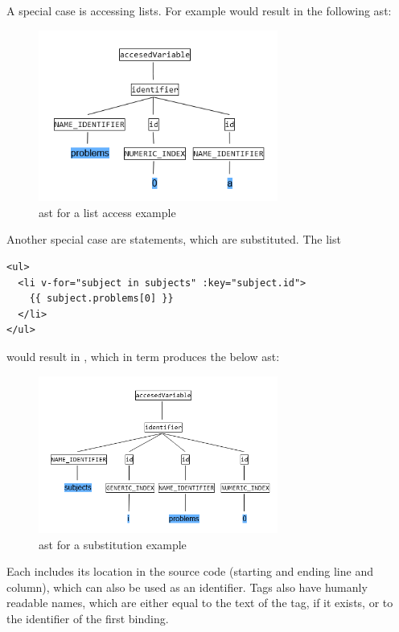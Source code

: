 A special case is accessing lists. For example  would result in the following \gls{ast}:

\begin{figure}[H]
    \centering
    \includegraphics[width=0.7\textwidth]{images/ast_problems_0_a.png}
     \caption{\gls{ast} for a list access example }
     \label{fig:ast_list_simple}
\end{figure}
Another special case are  statements, which are substituted. The list
\begin{lstlisting}[style=html, caption={List using v-for}, captionpos=b]
<ul>
  <li v-for="subject in subjects" :key="subject.id">
    {{ subject.problems[0] }}
  </li>
</ul>
\end{lstlisting}
would result in , which in term produces the below \gls{ast}:

\begin{figure}[H]
    \centering
    \includegraphics[width=0.7\textwidth]{images/ast_numeric_generic.png}
     \caption{\gls{ast} for a  substitution example }
     \label{fig:ast_list_complex}
\end{figure}

Each  includes its location in the source code (starting and ending line and column), which can also be used as an identifier. Tags also have humanly readable names, which are either equal to the text of the tag, if it exists, or to the identifier of the first binding. 

